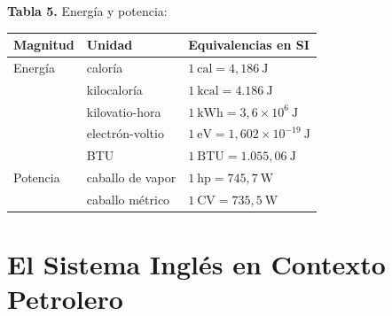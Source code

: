 \documentclass[12pt, letterpaper]{article}
\begin{document}
\begin{cuadroteoria}
  \textbf{Tabla 5.} Energía y potencia:
  \begin{center}
    \begin{tabular}{lll}
      \toprule
      \textbf{Magnitud} & \textbf{Unidad} & \textbf{Equivalencias en SI} \\
      \midrule
      Energía   & caloría  & $1\ \text{cal} = 4{,}186\ \text{J}$            \\
                & kilocaloría & $1\ \text{kcal} = 4.186\ \text{J}$          \\
                & kilovatio-hora & $1\ \text{kWh} = 3{,}6 \times 10^{6}\ \text{J}$ \\
                & electrón-voltio & $1\ \text{eV} = 1{,}602 \times 10^{-19}\ \text{J}$ \\
                & BTU      & $1\ \text{BTU} = 1.055{,}06\ \text{J}$        \\
      \midrule
      Potencia  & caballo de vapor & $1\ \text{hp} = 745{,}7\ \text{W}$  \\
                & caballo métrico  & $1\ \text{CV} = 735{,}5\ \text{W}$  \\
      \bottomrule
    \end{tabular}
  \end{center}
\end{cuadroteoria}

\section{El Sistema Inglés en Contexto Petrolero}
\end{document}
